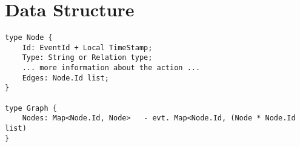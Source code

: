 \section{Data Structure}\label{sec:datastructure}
\begin{lstlisting}[breaklines=true]
type Node {
	Id: EventId + Local TimeStamp;
	Type: String or Relation type;
	... more information about the action ...
	Edges: Node.Id list;
}

type Graph {
	Nodes: Map<Node.Id, Node>	- evt. Map<Node.Id, (Node * Node.Id list)
}
\end{lstlisting}